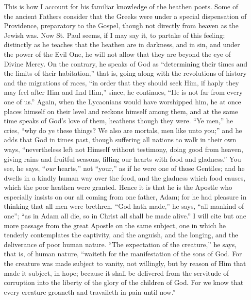 This is how I account for his familiar knowledge of
the heathen poets. Some of the ancient Fathers consider
that the Greeks were under a special dispensation of
Providence, preparatory to the Gospel, though not
directly from heaven as the Jewish was. Now St. Paul
seems, if I may say it, to partake of this feeling;
distinctly as he teaches that the heathen are in
darkness, and in sin, and under the power of the Evil
One, he will not allow that they are beyond the eye of
Divine Mercy. On the contrary, he speaks of God as
``determining their times and the limits of their
habitation,'' that is, going along with the
revolutions of history and the migrations of races,
``in order that they should seek Him, if haply they
may feel after Him and find Him,'' since, he
continues, ``He is not far from every one of
us.'' Again, when the Lycaonians would have
worshipped him, he at once places himself on their level
and reckons himself among them, and at the same time
speaks of God's love of them, heathens though they were.
``Ye men,'' he cries, ``why do ye these
things? We also are mortals, men like unto you;'' and
he adds that God in times past, though suffering all
nations to walk in their own ways, ``nevertheless
left not Himself without testimony, doing good from
heaven, giving rains and fruitful seasons, filling our
hearts with food and gladness.'' You see, he says,
``\emph{our} hearts,'' not ``your,'' as
if he were one of those Gentiles; and he dwells in a
kindly human way over the food, and the gladness which
food causes, which the poor heathen were granted. Hence
it is that he is the Apostle who especially insists on
our all coming from one father, Adam; for he had pleasure
in thinking that all men were brethren. ``God hath
made,'' he says, ``all mankind of one'';
``as in Adam all die, so in Christ all shall be made
alive.'' I will cite but one more passage from the
great Apostle on the same subject, one in which he
tenderly contemplates the captivity, and the anguish, and
the longing, and the deliverance of poor human nature.
``The expectation of the creature,'' he says,
that is, of human nature, ``waiteth for the
manifestation of the sons of God. For the creature was
made subject to vanity, not willingly, but by reason of
Him that made it subject, in hope; because it shall be
delivered from the servitude of corruption into the
liberty of the glory of the children of God. For we know
that every creature groaneth and travaileth in pain until
now.''

